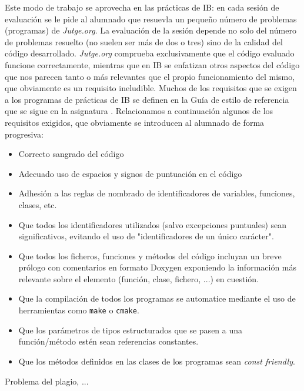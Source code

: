 \documentclass[twocolumn,twoside,a4paper, 10pt]{article}
\newcommand{\jutge}{\textit{Jutge.org}{}}           %
\begin{document}
Este modo de trabajo se aprovecha en las prácticas de IB: en cada sesión de evaluación se le pide al alumnado
que resuevla un pequeño número de problemas (programas) de \jutge{}.
La evaluación de la sesión depende no solo del número de problemas resuelto (no suelen ser más de dos o tres)
sino de la calidad del código desarrollado.
\jutge{} comprueba exclusivamente que el código evaluado funcione correctamente, mientras que en IB se
enfatizan otros aspectos del código que nos parecen tanto o más relevantes que el propio funcionamiento del
mismo, que obviamente es un requisito ineludible.
Muchos de los requisitos que se exigen a los programas de prácticas de IB se definen en la Guía de estilo de 
referencia que se sigue en la asignatura \cite{Google::GSG}.
Relacionamos a continuación algunos de los requisitos exigidos, que obviamente se introducen al alumnado de
forma progresiva:
\begin{itemize}
\item Correcto sangrado del código
\item Adecuado uso de espacios y signos de puntuación en el código
\item Adhesión a las reglas de nombrado de identificadores de variables, funciones, clases, etc.
\item Que todos los identificadores utilizados (salvo excepciones puntuales) sean significativos, evitando el
  uso de "identificadores de un único carácter".
\item Que todos los ficheros, funciones y métodos del código incluyan un breve prólogo con comentarios en
  formato Doxygen exponiendo la información más relevante sobre el elemento (función, clase, fichero, ...) en
    cuestión.
\item Que la compilación de todos los programas se automatice mediante el uso de herramientas como
  \texttt{make} o \texttt{cmake}.
\item Que los parámetros de tipos estructurados que se pasen a una función/método estén sean referencias
  constantes.
\item Que los métodos definidos en las clases de los programas sean \textit{const friendly}.
\end{itemize}



Problema del plagio, ...
\end{document}
